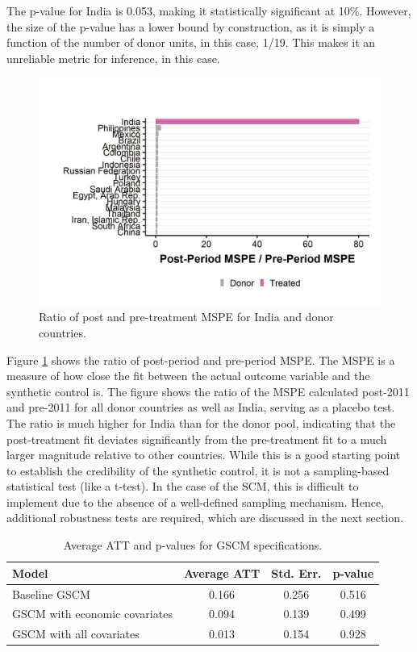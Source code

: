 \documentclass[12pt,nobind, a4paper]{reedthesis}
\begin{document}
 The p-value for India is 0.053, making it statistically significant at 10\%. However, the size of the p-value has a lower bound by construction, as it is simply a function of the number of donor units, in this case, 1/19. This makes it an unreliable metric for inference, in this case.
 \newpage
 \begin{figure}

 {\centering \includegraphics[width=1\linewidth]{figure/msperatio} 

 }

 \caption{Ratio of post and pre-treatment MSPE for India and donor countries.}\label{fig:msper}
 \end{figure}
 Figure \ref{fig:msper} shows the ratio of post-period and pre-period MSPE. The MSPE is a measure of how close the fit between the actual outcome variable and the synthetic control is. The figure shows the ratio of the MSPE calculated post-2011 and pre-2011 for all donor countries as well as India, serving as a placebo test. The ratio is much higher for India than for the donor pool, indicating that the post-treatment fit deviates significantly from the pre-treatment fit to a much larger magnitude relative to other countries. While this is a good starting point to establish the credibility of the synthetic control, it is not a sampling-based statistical test (like a t-test). In the case of the SCM, this is difficult to implement due to the absence of a well-defined sampling mechanism. Hence, additional robustness tests are required, which are discussed in the next section.
 \begin{table}[h!!]
 \centering
 \begin{tabular}{lccc}
 \hline
 \B Model & \B Average ATT & \B Std. Err. & \B p-value\\
 \hline
 Baseline GSCM&0.166& 0.256 & 0.516\\
 \hline
 GSCM with economic covariates & 0.094 & 0.139 & 0.499\\
 \hline
 GSCM with all covariates & 0.013 & 0.154 & 0.928\\
 \hline
 \end{tabular}
 \caption{ Average ATT and p-values for GSCM specifications.}
 \label{tab:t34}
 \end{table}
\end{document}
